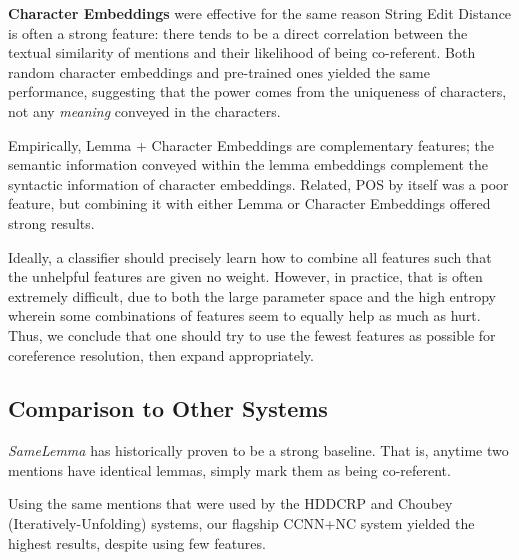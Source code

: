 \documentclass[11pt,a4paper]{article}
\begin{document}
\textbf{Character Embeddings} were effective for the same reason String Edit Distance is often a strong feature: there tends to be a direct correlation between the textual similarity of mentions and their likelihood of being co-referent. Both random character embeddings and pre-trained ones yielded the same performance, suggesting that the power comes from the uniqueness of characters, not any \textit{meaning} conveyed in the characters.

Empirically, Lemma + Character Embeddings are complementary features; the semantic information conveyed within the lemma embeddings complement the syntactic information of character embeddings.  Related, POS by itself was a poor feature, but combining it with either Lemma or Character Embeddings offered strong results. 

Ideally, a classifier should precisely learn how to combine all features such that the unhelpful features are given no weight.  However, in practice, that is often extremely difficult, due to both the large parameter space and the high entropy wherein some combinations of features seem to equally help as much as hurt.  Thus, we conclude that one should try to use the fewest features as possible for coreference resolution, then expand appropriately.


\subsection{Comparison to Other Systems}
\textit{SameLemma} has historically proven to be a strong baseline.  That is, anytime two mentions have identical lemmas, simply mark them as being co-referent.

Using the same mentions that were used by the HDDCRP and Choubey (Iteratively-Unfolding) systems, our flagship CCNN+NC system yielded the highest results, despite using few features.



\end{document}
